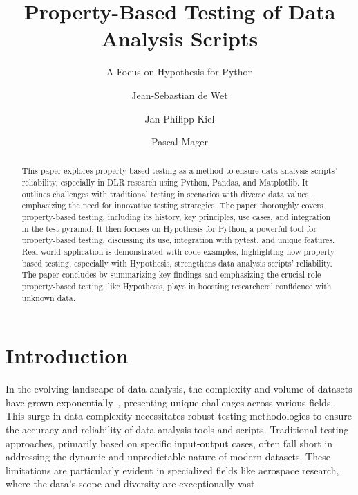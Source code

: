 \documentclass[runningheads]{llncs}
\begin{document}
%
\title{Property-Based Testing of Data Analysis Scripts}
\subtitle{A Focus on Hypothesis for Python}
%
%
\author{Jean-Sebastian de Wet \and
  Jan-Philipp Kiel \and
  Pascal Mager}
%
%
%
\maketitle              %
%
\begin{abstract}
  This paper explores property-based testing as a method to ensure data analysis scripts' reliability, especially in DLR research using Python, Pandas, and Matplotlib. It outlines challenges with traditional testing in scenarios with diverse data values, emphasizing the need for innovative testing strategies. The paper thoroughly covers property-based testing, including its history, key principles, use cases, and integration in the test pyramid. It then focuses on Hypothesis for Python, a powerful tool for property-based testing, discussing its use, integration with pytest, and unique features. Real-world application is demonstrated with code examples, highlighting how property-based testing, especially with Hypothesis, strengthens data analysis scripts' reliability. The paper concludes by summarizing key findings and emphasizing the crucial role property-based testing, like Hypothesis, plays in boosting researchers' confidence with unknown data.

\end{abstract}
%
%
%
\section{Introduction}
In the evolving landscape of data analysis, the complexity and volume of datasets have grown exponentially~\cite{Taylor2023}, presenting unique challenges across various fields. This surge in data complexity necessitates robust testing methodologies to ensure the accuracy and reliability of data analysis tools and scripts. Traditional testing approaches, primarily based on specific input-output cases, often fall short in addressing the dynamic and unpredictable nature of modern datasets. These limitations are particularly evident in specialized fields like aerospace research, where the data's scope and diversity are exceptionally vast.
\end{document}
